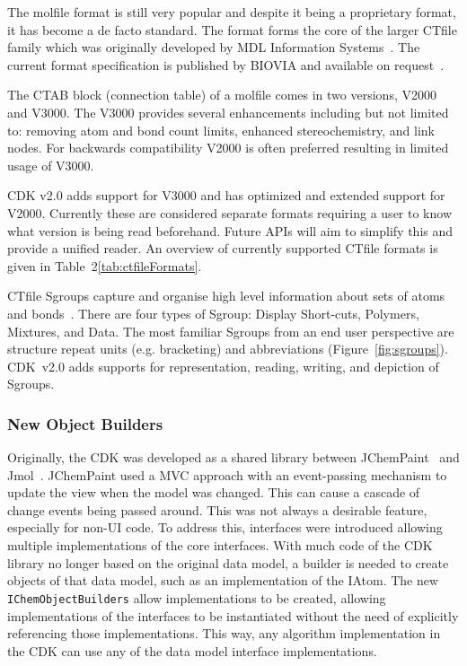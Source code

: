\documentclass[doublespacing]{bmcart}
\def \cdkversion {v2.0}
\begin{document}
The molfile format is still very popular and despite it being a proprietary
format, it has become a de facto standard. The format forms the core of the larger
CTfile family which was originally developed by MDL Information Systems~\cite{Dalby92}. The
current format specification is published by BIOVIA and available on 
request~\cite{ctfilespec}.
 
The CTAB block (connection table) of a molfile comes in two versions, V2000
and V3000. The V3000 provides several enhancements including but not
limited to: removing atom and bond count limits, enhanced stereochemistry,
and link nodes. For backwards compatibility V2000 is often preferred resulting
in limited usage of V3000.

CDK \cdkversion{} adds support for V3000 and has optimized and extended
support for V2000. Currently these are considered separate formats requiring
a user to know what version is being read beforehand. Future APIs will aim
to simplify this and provide a unified reader. An overview of currently
supported CTfile formats is given in Table~2\ref{tab:ctfileFormats}.

CTfile Sgroups capture and organise high level information about sets of atoms
and bonds~\cite{Gushurst91}. There are four types of Sgroup: Display Short-cuts, Polymers,
Mixtures, and Data. The most familiar Sgroups from an end user perspective are structure 
repeat units (e.g. bracketing) and abbreviations (Figure~\ref{fig:sgroups}).
CDK~\cdkversion{} adds supports for representation, reading, writing, and depiction of Sgroups.


\subsubsection*{New Object Builders}

Originally, the CDK was developed as a shared library between
JChemPaint~\cite{krause2000jchempaint} and
Jmol~\cite{Willighagen2007jmol,Hanson2010}.  JChemPaint used a MVC
approach with an event-passing mechanism to update the view when the
model was changed. This can cause a cascade of change events being
passed around. This was not always a desirable feature, especially for
non-UI code. To address this, interfaces were introduced allowing
multiple implementations of the core interfaces. With much code of the CDK
library no longer based on the original data model, a builder is needed to
create objects of that data model, such as an implementation of the IAtom.
The new \texttt{IChemObjectBuilders} allow implementations to be created, allowing
implementations of the interfaces to be instantiated without the need
of explicitly referencing those implementations. This way, any algorithm
implementation in the CDK can use any of the data model interface
implementations.
\end{document}
